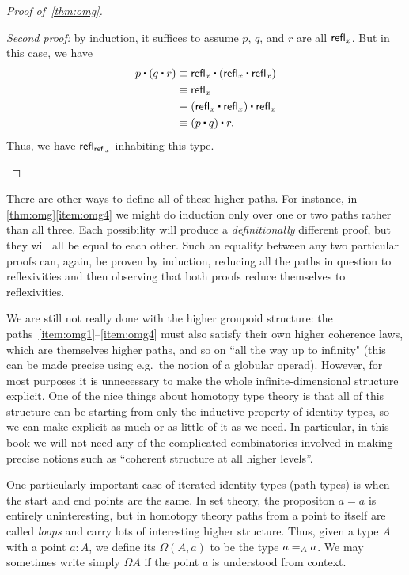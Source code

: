 \begin{proof}[Proof of~\autoref{thm:omg}]
\begin{enumerate}
    \mentalpause

    \noindent \emph{Second proof:} by induction, it suffices to assume $p$, $q$, and $r$ are all $\refl x$.
    But in this case, we have
    \begin{align*}
      p\ct (q\ct r)
      &\jdeq \refl{x}\ct(\refl{x}\ct \refl{x})\\
      &\jdeq \refl{x}\\
      &\jdeq (\refl{x}\ct \refl x)\ct \refl x\\
      &\jdeq (p\ct q)\ct r.
    \end{align*}
    Thus, we have $\refl{\refl{x}}$ inhabiting this type. \qedhere
  \end{enumerate}
\end{proof}

\begin{rmk}
  There are other ways to define all of these higher paths.
  For instance, in \autoref{thm:omg}\ref{item:omg4} we might do induction only over one or two paths rather than all three.
  Each possibility will produce a \emph{definitionally} different proof, but they will all be equal to each other.
  Such an equality between any two particular proofs can, again, be proven by induction, reducing all the paths in question to reflexivities and then observing that both proofs reduce themselves to reflexivities.
\end{rmk}

We are still not really done with the higher groupoid structure: the paths~\ref{item:omg1}--\ref{item:omg4} must also satisfy their own higher coherence laws, which are themselves higher paths, and so on ``all the way up to infinity" (this can be made precise using e.g.\ the notion of a globular operad).
However, for most purposes it is unnecessary to make the whole infinite-dimensional structure explicit.
One of the nice things about homotopy type theory is that all of this structure can be  starting from only the inductive property of identity types, so we can make explicit as much or as little of it as we need.
In particular, in this book we will not need any of the complicated combinatorics involved in making precise notions such as ``coherent structure at all higher levels''.

One particularly important case of iterated identity types (path types) is when the start and end points are the same.
In set theory, the propositon $a=a$ is entirely uninteresting, but in homotopy theory paths from a point to itself are called \emph{loops} and carry lots of interesting higher structure.
Thus, given a type $A$ with a point $a:A$, we define its  $\Omega(A,a)$ to be the type $\id[A]{a}{a}$.
We may sometimes write simply $\Omega A$ if the point $a$ is understood from context.

